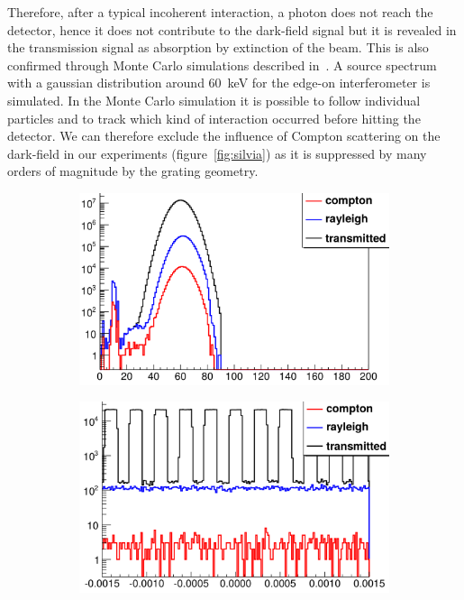 Therefore, after a typical incoherent interaction, a photon does not reach
the detector, hence it does not contribute to the dark-field signal but it
is revealed in the transmission signal as absorption by extinction of the
beam. This is also confirmed through Monte Carlo simulations described
in~\parencite{silviathesis}. A source spectrum with a gaussian distribution
around \SI{60}{\kilo\eV} for the edge-on interferometer is simulated. In the
Monte Carlo simulation it is possible to follow individual particles and to
track which kind of interaction occurred before hitting the detector.
We can therefore exclude the influence of Compton scattering on the
dark-field in our experiments (figure~\ref{fig:silvia}) as it is suppressed
by many orders of magnitude by the grating geometry.

\begin{figure}[htb]
    \centering
    \begin{subfigure}[b]{.49\textwidth}
    \centering
    \includegraphics[width=\textwidth]{gfx/compton/scattering_monte_carlo_energy.png}
    \caption{}
    \end{subfigure}
    \begin{subfigure}[b]{.49\textwidth}
    \centering
    \includegraphics[width=\textwidth]{gfx/compton/scattering_monte_carlo_position.png}

\end{subfigure}
\end{figure}
